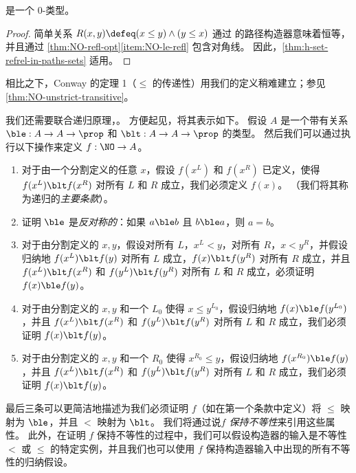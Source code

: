 \begin{cor}\label{thm:NO-set}
\NO 是一个 0-类型。
\end{cor}
\begin{proof}
  简单关系 $R(x,y)\defeq (x\le y) \land (y\le x)$ 通过 \NO 的路径构造器意味着恒等，并且通过 \cref{thm:NO-refl-opt}\ref{item:NO-le-refl} 包含对角线。
  因此，\cref{thm:h-set-refrel-in-paths-sets} 适用。
\end{proof}

相比之下，Conway 的定理 1（$\le$ 的传递性）用我们的定义稍难建立；参见 \cref{thm:NO-unstrict-transitive}。



我们还需要联合递归原理，。
方便起见，将其表示如下。
假设 $A$ 是一个带有关系 $\mathord\ble:A\to A\to\prop$ 和 $\mathord\blt:A\to A\to\prop$ 的类型。
然后我们可以通过执行以下操作来定义 $f:\NO\to A$。
\begin{enumerate}
  \item 对于由一个分割定义的任意 $x$，假设 $f(x^L)$ 和 $f(x^R)$ 已定义，使得 $f(x^L)\blt f(x^R)$ 对所有 $L$ 和 $R$ 成立，我们必须定义 $f(x)$。 （我们将其称为递归的\emph{主要条款}）。\label{item:NO-rec-primary}
  \item 证明 $\ble$ 是\emph{反对称的}：如果 $a\ble b$ 且 $b\ble a$，则 $a=b$。
  \item 对于由分割定义的 $x,y$，假设对所有 $L$，$x^L<y$，对所有 $R$，$x<y^R$，并假设归纳地 $f(x^L)\blt f(y)$ 对所有 $L$ 成立，$f(x)\blt f(y^R)$ 对所有 $R$ 成立，并且 $f(x^L)\blt f(x^R)$ 和 $f(y^L)\blt f(y^R)$ 对所有 $L$ 和 $R$ 成立，必须证明 $f(x)\ble f(y)$。
  \item 对于由分割定义的 $x,y$ 和一个 $L_0$ 使得 $x\le y^{L_0}$，假设归纳地 $f(x)\ble f(y^{L_0})$，并且 $f(x^L)\blt f(x^R)$ 和 $f(y^L)\blt f(y^R)$ 对所有 $L$ 和 $R$ 成立，我们必须证明 $f(x)\blt f(y)$。
  \item 对于由分割定义的 $x,y$ 和一个 ${R_0}$ 使得 $x^{R_0}\le y$，假设归纳地 $f(x^{R_0})\ble f(y)$，并且 $f(x^L)\blt f(x^R)$ 和 $f(y^L)\blt f(y^R)$ 对所有 $L$ 和 $R$ 成立，我们必须证明 $f(x)\blt f(y)$。 \label{item:NO-rec-last}
\end{enumerate}
最后三条可以更简洁地描述为我们必须证明 $f$（如在第一个条款中定义）将 $\le$ 映射为 $\ble$，并且 $<$ 映射为 $\blt$。
我们将通过说\emph{$f$ 保持不等性}来引用这些属性。
此外，在证明 $f$ 保持不等性的过程中，我们可以假设构造器的输入是不等性 $<$ 或 $\le$ 的特定实例，并且我们也可以使用 $f$ 保持构造器输入中出现的所有不等性的归纳假设。

